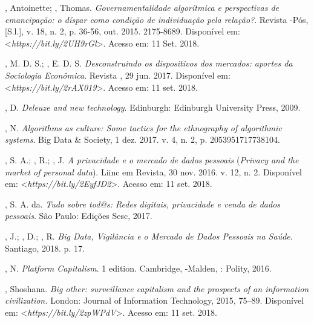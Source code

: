 \begin{Parskip}
, Antoinette; , Thomas. \emph{Governamentalidade
algorítmica e perspectivas de emancipação: o díspar como condição de
individuação pela relação?}. Revista -Pós, [S.l.], v. 18, n. 2, p.
36-56, out. 2015.  2175-8689. Disponível em:
\textless{}\emph{https://bit.ly/2UH9rGl}\textgreater{}. Acesso em: 11 Set. 2018.

, M. D. S.; , E. D. S. \emph{Desconstruindo os
dispositivos dos mercados: aportes da Sociologia Econômica}. Revista
, 29 jun. 2017. Disponível em: \textless{}\emph{https://bit.ly/2rAX019}\textgreater{}. Acesso em: 11 set. 2018.

, D. \emph{Deleuze and new technology}. Edinburgh: Edinburgh
University Press, 2009.

, N. \emph{Algorithms as culture: Some tactics for the
ethnography of algorithmic systems}. Big Data \& Society, 1 dez. 2017. v.
4, n. 2, p. 2053951717738104.

, S. A.; , R.; , J. \emph{A privacidade e o
mercado de dados pessoais} (\emph{Privacy and the market of personal
data}). Liinc em Revista, 30 nov. 2016. v. 12, n. 2. Disponível em:
\textless{}\emph{https://bit.ly/2EyfJD2}\textgreater{}. Acesso em: 11 set. 2018.

, S. A. da. \emph{Tudo sobre tod@s: Redes digitais,
privacidade e venda de dados pessoais}. São Paulo: Edições Sesc, 2017.

, J.; , D.; , R. \emph{Big Data, Vigilância e o
Mercado de Dados Pessoais na Saúde}. Santiago, 2018. p. 17.

, N. \emph{Platform Capitalism}. 1 edition. Cambridge, -Malden,
: Polity, 2016.

, Shoshana. \emph{Big other: surveillance capitalism and the
prospects of an information civilization.} London: Journal of
Information Technology, 2015, 75--89. Disponível em: \textless{}\emph{https://bit.ly/2zpWPdV}\textgreater{}. Acesso em: 11 set. 2018.
\end{Parskip}
